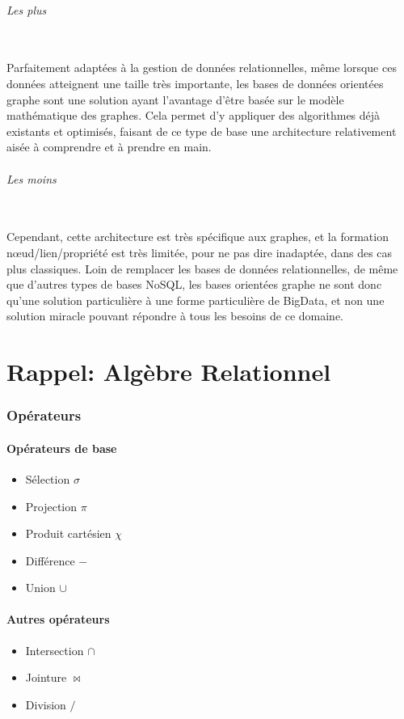 \documentclass[a4paper,11pt]{article}
\begin{document}
		\paragraph{Les plus}~\\
		
		Parfaitement adaptées à la gestion de données relationnelles, même lorsque ces données atteignent une taille très importante, les bases de données orientées graphe sont une solution ayant l’avantage d’être basée sur le modèle mathématique des graphes. Cela permet d’y appliquer des algorithmes déjà existants et optimisés, faisant de ce type de base une architecture relativement aisée à comprendre et à prendre en main.

		\paragraph{Les moins}~\\
		
		Cependant, cette architecture est très spécifique aux graphes, et la formation n\oe{}ud/lien/propriété est très limitée, pour ne pas dire inadaptée, dans des cas plus classiques. Loin de remplacer les bases de données relationnelles, de même que d’autres types de bases NoSQL, les bases orientées graphe ne sont donc qu’une solution particulière à une forme particulière de BigData, et non une solution \og{}miracle\fg{} pouvant répondre à tous les besoins de ce domaine.

\part{Rappel: Algèbre Relationnel}
	\section{Opérateurs}
		\subsection{Opérateurs de base}
		\begin{itemize}
			\item Sélection $\sigma$
			\item Projection $\pi$
			\item Produit cartésien $\chi$
			\item Différence $-$
			\item Union $\cup$
		\end{itemize}
		
		\subsection{Autres opérateurs}
		\begin{itemize}
			\item Intersection $\cap$
			\item Jointure $\Join$
			\item Division $/$
		\end{itemize}
\end{document}
